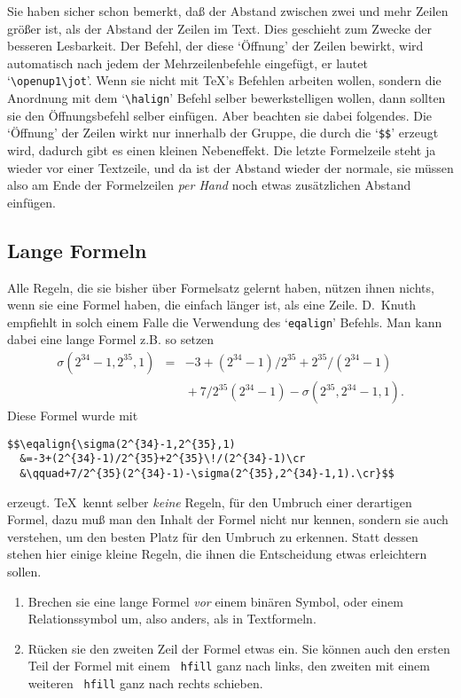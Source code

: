Sie haben sicher schon bemerkt, da\ss{} der Abstand zwischen zwei und mehr
Zeilen 
gr\"o\ss{}er ist, als der Abstand der Zeilen im Text. Dies geschieht
zum Zwecke der besseren Lesbarkeit. Der Befehl, der diese `\"Offnung'
der Zeilen bewirkt, wird automatisch nach jedem der Mehrzeilenbefehle
eingef\"ugt, er lautet 
`\verb|\openup1\jot|'. Wenn sie nicht mit \TeX's
Befehlen arbeiten wollen, sondern die Anordnung mit dem
`\verb|\halign|'
Befehl selber bewerkstelligen wollen, dann sollten sie den
\"Offnungsbefehl selber einf\"ugen. Aber beachten sie dabei folgendes. Die
`\"Offnung' der Zeilen wirkt nur innerhalb der
Gruppe, die durch die
`\verb|$$|' erzeugt wird, dadurch gibt es einen kleinen
Nebeneffekt.
Die letzte Formelzeile steht ja wieder vor einer Textzeile, und da ist
der 
Abstand wieder der normale, sie m\"ussen also am Ende der
Formelzeilen {\em per Hand} noch etwas zus\"atzlichen Abstand einf\"ugen.
\subsection{Lange Formeln}
Alle Regeln, die sie bisher \"uber Formelsatz gelernt haben, n\"utzen
ihnen nichts, wenn sie eine Formel haben, die einfach l\"anger ist, als
eine Zeile. 
D.~Knuth empfiehlt in solch einem Falle die Verwendung des
`\verb|eqalign|' Befehls. Man kann dabei eine lange Formel z.B. so
setzen
\begin{eqnarray*}
\sigma(2^{34}-1,2^{35},1)&=&-3+(2^{34}-1)/2^{35}+2^{35}\!/(2^{34}-1)\\
 & &{}+7/2^{35}(2^{34}-1)-\sigma(2^{35},2^{34}-1,1).\end{eqnarray*}
Diese Formel wurde mit
\begin{verbatim}
$$\eqalign{\sigma(2^{34}-1,2^{35},1)
  &=-3+(2^{34}-1)/2^{35}+2^{35}\!/(2^{34}-1)\cr
  &\qquad+7/2^{35}(2^{34}-1)-\sigma(2^{35},2^{34}-1,1).\cr}$$
\end{verbatim}
erzeugt. \TeX\ kennt selber {\em keine} Regeln, f\"ur den Umbruch einer
derartigen Formel, dazu mu\ss{} man den Inhalt der Formel nicht nur
kennen, sondern sie auch verstehen, um den besten Platz f\"ur den
Umbruch zu erkennen. Statt dessen stehen hier einige kleine Regeln,
die ihnen die 
Entscheidung etwas erleichtern sollen.
\begin{enumerate}
\item Brechen sie eine lange Formel {\em vor} einem bin\"aren Symbol,
oder einem 
Relationssymbol um, also anders, als in Textformeln.
\item R\"ucken sie den zweiten Zeil der Formel etwas ein. Sie k\"onnen
auch den ersten Teil der Formel mit einem {\tt{} hfill} ganz nach
links, den zweiten mit einem weiteren {\tt{} hfill} ganz nach
rechts schieben.
\end{enumerate}

